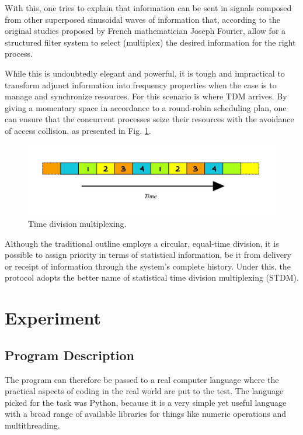 \documentclass[12pt]{article}
\begin{document}
With this, one tries to explain that information can be sent in signals composed from other superposed sinusoidal waves of information that, according to the original studies proposed by French mathematician Joseph Fourier, allow for a structured filter system to select (multiplex) the desired information for the right process.

While this is undoubtedly elegant and powerful, it is tough and impractical to transform adjunct information into frequency properties when the case is to manage and synchronize resources. For this scenario is where TDM arrives. By giving a momentary space in accordance to a round-robin scheduling plan, one can ensure that the concurrent processes seize their resources with the avoidance of access collision, as presented in Fig. \ref{fig:time}.

\begin{figure}[ht]
\includegraphics[width=1\textwidth]{time}
\centering
\caption{Time division multiplexing.}
\label{fig:time}
\end{figure}

Although the traditional outline employs a circular, equal-time division, it is possible to assign priority in terms of statistical information, be it from delivery or receipt of information through the system's complete history. Under this, the protocol adopts the better name of statistical time division multiplexing (STDM).

\section{Experiment}

\subsection{Program Description}

The program can therefore be passed to a real computer language where the practical aspects of coding in the real world are put to the test. The language picked for the task was Python, because it is a very simple yet useful language with a broad range of available libraries for things like numeric operations and multithreading.
\end{document}
